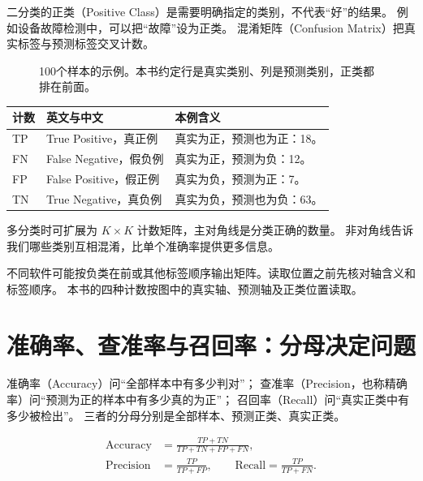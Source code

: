 二分类的正类（Positive Class）是需要明确指定的类别，不代表“好”的结果。
例如设备故障检测中，可以把“故障”设为正类。
混淆矩阵（Confusion Matrix）把真实标签与预测标签交叉计数。

\begin{figure}[htbp]
\centering
\caption{100个样本的示例。本书约定行是真实类别、列是预测类别，正类都排在前面。}
\label{fig:eval-confusion}
\par\smallskip
{}
\end{figure}

\begin{center}
\small
\begin{tabularx}{\textwidth}{P{24mm}Y Y}
\toprule
计数 & 英文与中文 & 本例含义\\
\midrule
TP & True Positive，真正例 & 真实为正，预测也为正：18。\\
FN & False Negative，假负例 & 真实为正，预测为负：12。\\
FP & False Positive，假正例 & 真实为负，预测为正：7。\\
TN & True Negative，真负例 & 真实为负，预测也为负：63。\\
\bottomrule
\end{tabularx}
\end{center}

多分类时可扩展为 $K\times K$ 计数矩阵，主对角线是分类正确的数量。
非对角线告诉我们哪些类别互相混淆，比单个准确率提供更多信息。

\begin{pitfall}
不同软件可能按负类在前或其他标签顺序输出矩阵。读取位置之前先核对轴含义和标签顺序。
本书的四种计数按图中的真实轴、预测轴及正类位置读取。
\end{pitfall}

\section{准确率、查准率与召回率：分母决定问题}
\label{sec:eval-precision-recall}

准确率（Accuracy）问“全部样本中有多少判对”；
查准率（Precision，也称精确率）问“预测为正的样本中有多少真的为正”；
召回率（Recall）问“真实正类中有多少被检出”。
三者的分母分别是全部样本、预测正类、真实正类。

\begin{align}
 \mathrm{Accuracy}&=\frac{TP+TN}{TP+TN+FP+FN},\\
 \mathrm{Precision}&=\frac{TP}{TP+FP},\qquad
 \mathrm{Recall}=\frac{TP}{TP+FN}.
\end{align}

